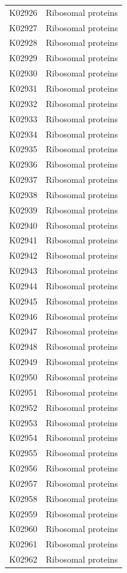 \begin{longtable}{@{}l l@{}}
K02926 & Ribosomal proteins \\
K02927 & Ribosomal proteins \\
K02928 & Ribosomal proteins \\
K02929 & Ribosomal proteins \\
K02930 & Ribosomal proteins \\
K02931 & Ribosomal proteins \\
K02932 & Ribosomal proteins \\
K02933 & Ribosomal proteins \\
K02934 & Ribosomal proteins \\
K02935 & Ribosomal proteins \\
K02936 & Ribosomal proteins \\
K02937 & Ribosomal proteins \\
K02938 & Ribosomal proteins \\
K02939 & Ribosomal proteins \\
K02940 & Ribosomal proteins \\
K02941 & Ribosomal proteins \\
K02942 & Ribosomal proteins \\
K02943 & Ribosomal proteins \\
K02944 & Ribosomal proteins \\
K02945 & Ribosomal proteins \\
K02946 & Ribosomal proteins \\
K02947 & Ribosomal proteins \\
K02948 & Ribosomal proteins \\
K02949 & Ribosomal proteins \\
K02950 & Ribosomal proteins \\
K02951 & Ribosomal proteins \\
K02952 & Ribosomal proteins \\
K02953 & Ribosomal proteins \\
K02954 & Ribosomal proteins \\
K02955 & Ribosomal proteins \\
K02956 & Ribosomal proteins \\
K02957 & Ribosomal proteins \\
K02958 & Ribosomal proteins \\
K02959 & Ribosomal proteins \\
K02960 & Ribosomal proteins \\
K02961 & Ribosomal proteins \\
K02962 & Ribosomal proteins \\

\end{longtable}
